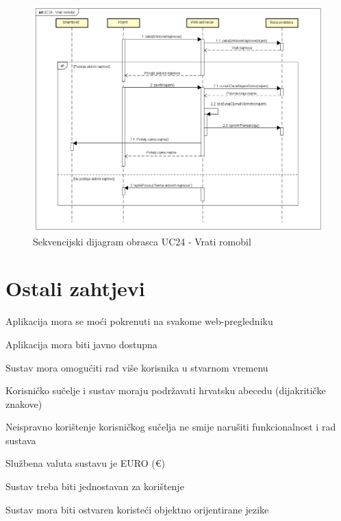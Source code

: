 						\begin{figure} [H]
							
							\includegraphics[width=1\linewidth]{dijagrami/UC24 - Vrati romobil.png}
							\centering
							\caption{Sekvencijski dijagram obrasca UC24 - Vrati romobil}
							\label{fig:Sekvencijski dijagram obrasca UC24 - Vrati romobil}
						\end{figure}
				\eject
	

		\section{Ostali zahtjevi}
		
			
		 
			 \begin{packed_item}
			 	\item Aplikacija mora se moći pokrenuti na svakome web-pregledniku
			 	\item Aplikacija mora biti javno dostupna
			 	\item Sustav mora omogućiti rad više korisnika u stvarnom vremenu
			 	\item Korisničko sučelje i sustav moraju podržavati hrvatsku abecedu (dijakritičke znakove)
			 	\item Neispravno korištenje korisničkog sučelja ne smije narušiti funkcionalnost i rad sustava
			 	\item Službena valuta sustavu je EURO (€)
			 	\item Sustav treba biti jednostavan za korištenje
			 	\item Sustav mora biti ostvaren koristeći objektno orijentirane jezike
			 	
			 	
			 \end{packed_item}
			 
			 
			 
	